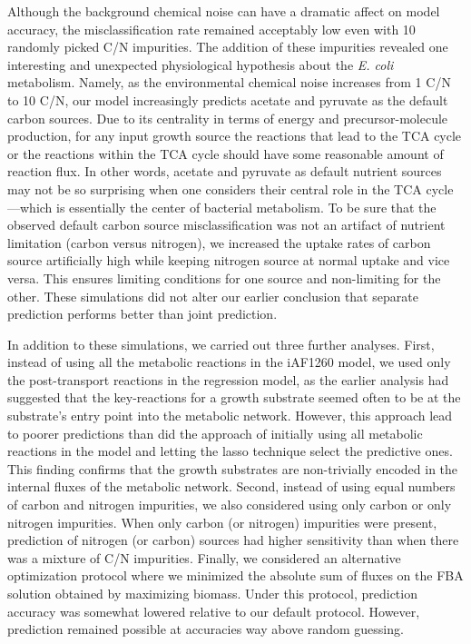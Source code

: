 \documentclass[12pt]{article}
\begin{document}
Although the background chemical noise can have a dramatic affect on model accuracy, the misclassification rate remained acceptably low even with 10 randomly picked C/N impurities. The addition of these impurities revealed one interesting and unexpected physiological hypothesis about the \emph{E. coli} metabolism. Namely, as the environmental chemical noise increases from 1 C/N to 10 C/N, our model increasingly predicts acetate and pyruvate as the default carbon sources. Due to its centrality in terms of energy and precursor-molecule production, for any input growth source the reactions that lead to the TCA cycle or the reactions within the TCA cycle should have some reasonable amount of reaction flux. In other words, acetate and pyruvate as default nutrient sources may not be so surprising when one considers their central role in the TCA cycle---which is essentially the center of bacterial metabolism. To be sure that the observed default carbon source misclassification was not an artifact of nutrient limitation (carbon versus nitrogen), we increased the uptake rates of carbon source artificially high while keeping nitrogen source at normal uptake and vice versa. This ensures limiting conditions for one source and non-limiting for the other. These simulations did not alter our earlier conclusion that separate prediction performs better than joint prediction.

In addition to these simulations, we carried out three further analyses. First, instead of using all the metabolic reactions in the iAF1260 model, we used only the post-transport reactions in the regression model, as the earlier analysis had suggested that the key-reactions for a growth substrate seemed often to be at the substrate's entry point into the metabolic network. However, this approach lead to poorer predictions than did the approach of initially using all metabolic reactions in the model and letting the lasso technique select the predictive ones. This finding confirms that the growth substrates are non-trivially encoded in the internal fluxes of the metabolic network. Second, instead of using equal numbers of carbon and nitrogen impurities, we also considered using only carbon or only nitrogen impurities. When only carbon (or nitrogen) impurities were present, prediction of nitrogen (or carbon) sources had higher sensitivity than when there was a mixture of C/N impurities. Finally, we considered an alternative optimization protocol where we minimized the absolute sum of fluxes on the FBA solution obtained by maximizing biomass. Under this protocol, prediction accuracy was somewhat lowered relative to our default protocol. However, prediction remained possible at accuracies way above random guessing.
\end{document}
